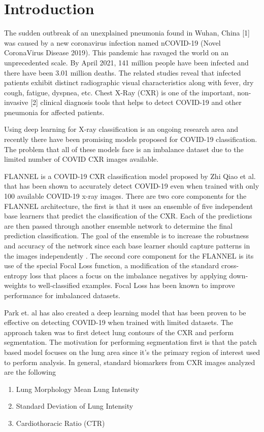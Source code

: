 \documentclass{sigkddExp}
\begin{document}
\section{Introduction}
The sudden outbreak of an unexplained pneumonia found in Wuhan, China [1] was
caused by a new coronavirus infection named nCOVID-19 (Novel CoronaVirus Disease
2019). This pandemic has ravaged the world on an unprecedented scale. By April
2021, 141 million people have been infected and there have been 3.01 million
deaths. The related studies reveal that infected patients exhibit distinct
radiographic visual characteristics along with fever, dry cough, fatigue,
dyspnea, etc. Chest X-Ray (CXR) is one of the important, non-invasive [2]
clinical diagnosis tools that helps to detect COVID-19 and other pneumonia for
affected patients.

Using deep learning for X-ray classification is an ongoing research area and
recently there have been promising models proposed for COVID-19 classification.
The problem that all of these models face is an imbalance dataset due to the
limited number of COVID CXR images available.

FLANNEL is a COVID-19 CXR classification model proposed by Zhi Qiao et al.
\cite{10.1093/jamia/ocaa280} that has been shown to accurately detect COVID-19
even when trained with only 100 available COVID-19 x-ray images. There are two
core components for the FLANNEL architecture, the first is that it uses an
ensemble \cite{58871} of five independent base learners that predict the
classification of the CXR. Each of the predictions are then passed through
another ensemble network to determine the final prediction classification. The
goal of the ensemble is to increase the robustness and accuracy of the network
since each base learner should capture patterns in the images independently
\cite{combine}. The second core component for the FLANNEL is its use of the
special Focal Loss \cite{lin2018focal} function, a modification of the standard
cross-entropy loss that places a focus on the imbalance negatives by applying
down-weights to well-classified examples. Focal Loss has been known to improve
performance for imbalanced datasets.

Park et. al \cite{pmid32396075} has also created a deep learning model that has
been proven to be effective on detecting COVID-19 when trained with limited
datasets. The approach taken was to first detect lung contours of the CXR and
perform segmentation. The motivation for performing segmentation first is that
the patch based model focuses on the lung area since it’s the primary region of
interest used to perform analysis.  In general, standard biomarkers
\cite{pmid32396075} from CXR images analyzed are the following
\begin{enumerate}
    \item Lung Morphology Mean Lung Intensity
    \item Standard Deviation of Lung Intensity
    \item Cardiothoracic Ratio (CTR)
\end{enumerate}
\end{document}
